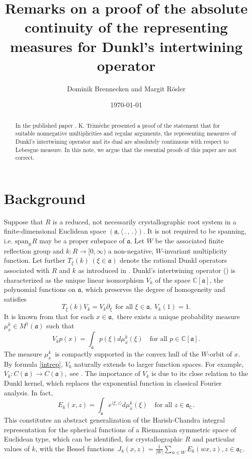 \documentclass[reqno]{amsart}
\title[On the representing measures of Dunkl's intertwining operator]
{Remarks on a proof of the absolute continuity of the representing measures for Dunkl's intertwining operator     }
\author{Dominik Brennecken and Margit R\"osler}
\theoremstyle{plain}
\theoremstyle{definition}
\theoremstyle{remark}
\numberwithin{equation}{section}
\begin{document}
\date{\today}



\begin{abstract}
In the published paper \cite{T10},   K. Trim\`eche presented a proof 
of the statement that for suitable nonnegative 
multiplicities and regular arguments, the representing measures of Dunkl's intertwining operator and its dual are absolutely continuous with respect to Lebesgue measure. In this note, we argue that the essential proofs of this paper are not correct.  


\end{abstract}


\maketitle




\section{Background}

Suppose that $R$ is a reduced, not necessarily crystallographic root system in a finite-dimensional Euclidean space $(\mathfrak a, \langle\,.\,,\,.\,\rangle)$.  It is not required to be spanning, i.e. $\text{span}_{\mathbb  R} R$ may be a proper subspace of $\mathfrak a.$ Let $W$ be the associated finite reflection group and  $k: R\to  [0,\infty)$  a non-negative, $W$-invariant multiplicity function. Let further $T_\xi(k) \> (\xi\in \mathfrak a)$ denote the rational Dunkl operators associated with $R$ and $k$ as introduced in \cite{D89}.
Dunkl's intertwining operator (\cite{D91}) is characterized as the unique linear isomorphism  $V_k$ of 
  the space $\mathbb C[\mathfrak a]$, the polynomial functions on $\mathfrak a$, which preserves the degree of homogeneity and satisfies 
  $$ T_\xi(k) V_k = V_k \partial_\xi \>\>\text{for all } \xi \in \mathfrak a, \>V_k(1) =1.$$
  It is known from \cite{R99} that for each $x\in \mathfrak a, $ there exists a unique probability measure $\mu_x^k\in M^1(\mathfrak a)$ such that
  \begin{equation}\label{intrep} V_kp(x) = \int_{\mathfrak a} p(\xi)d\mu_x^k(\xi) \quad \text{for all } p\in \mathbb C[\mathfrak a]. \end{equation}
   The measure $\mu_x^k\,$ is compactly supported in the convex hull of the $W$-orbit of $x.$ 
  By formula \eqref{intrep}, $V_k$ naturally extends to larger function spaces. For example,  $V_k: C(\mathfrak a) \to C(\mathfrak a),$   see \cite{T01}.
  The importance of $V_k$ is due to its close relation to the  Dunkl kernel, which replaces the exponential function in classical  Fourier analysis. In fact, 
  $$ E_k(x,z) = \int_{\mathfrak a} e^{\langle\xi,z\rangle} d\mu_x^k(\xi) \quad \text{for all } z\in \mathfrak 
  a_{\mathbb C}.$$
  This constitutes an abstract  generalization of the Harish-Chandra integral representation for the spherical functions of a Riemannian symmetric space of Euclidean type, which can be identified, for crystallographic $R$ and particular values of $k$, 
  with  the Bessel functions $\,J_k(x, z) =  \frac{1}{|W|} \sum_{w\in W}E_k(wx, z), z \in  \mathfrak a_{\mathbb C}.$
  
\end{document}

